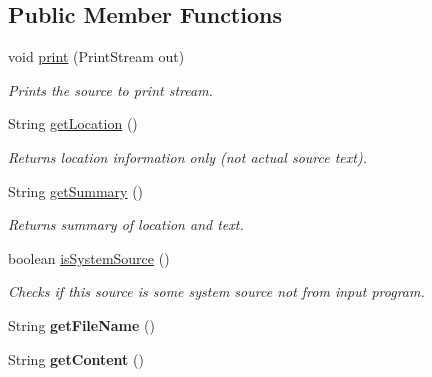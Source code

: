 \subsection*{Public Member Functions}
\begin{DoxyCompactItemize}
\item 
void \hyperlink{classedu_1_1udel_1_1cis_1_1vsl_1_1civl_1_1model_1_1common_1_1SystemCIVLSource_aeb85d11cab7acf7923a70fa2de53a3a5}{print} (Print\+Stream out)
\begin{DoxyCompactList}\small\item\em Prints the source to print stream. \end{DoxyCompactList}\item 
String \hyperlink{classedu_1_1udel_1_1cis_1_1vsl_1_1civl_1_1model_1_1common_1_1SystemCIVLSource_ade6d77352eb918f6f4b8f302d19d4c4e}{get\+Location} ()
\begin{DoxyCompactList}\small\item\em Returns location information only (not actual source text). \end{DoxyCompactList}\item 
String \hyperlink{classedu_1_1udel_1_1cis_1_1vsl_1_1civl_1_1model_1_1common_1_1SystemCIVLSource_a27f0228a17f53f5c97ec5341c64e84c0}{get\+Summary} ()
\begin{DoxyCompactList}\small\item\em Returns summary of location and text. \end{DoxyCompactList}\item 
boolean \hyperlink{classedu_1_1udel_1_1cis_1_1vsl_1_1civl_1_1model_1_1common_1_1SystemCIVLSource_aafd6090b5f962e4790db42aa99e3537d}{is\+System\+Source} ()
\begin{DoxyCompactList}\small\item\em Checks if this source is some system source not from input program. \end{DoxyCompactList}\item 
\hypertarget{classedu_1_1udel_1_1cis_1_1vsl_1_1civl_1_1model_1_1common_1_1SystemCIVLSource_a45decf4f7bc99060ef8f8899defb94e2}{}String {\bfseries get\+File\+Name} ()\label{classedu_1_1udel_1_1cis_1_1vsl_1_1civl_1_1model_1_1common_1_1SystemCIVLSource_a45decf4f7bc99060ef8f8899defb94e2}

\item 
\hypertarget{classedu_1_1udel_1_1cis_1_1vsl_1_1civl_1_1model_1_1common_1_1SystemCIVLSource_aabb78ddf2467eae9558e5f47ab11716a}{}String {\bfseries get\+Content} ()\label{classedu_1_1udel_1_1cis_1_1vsl_1_1civl_1_1model_1_1common_1_1SystemCIVLSource_aabb78ddf2467eae9558e5f47ab11716a}

\end{DoxyCompactItemize}


